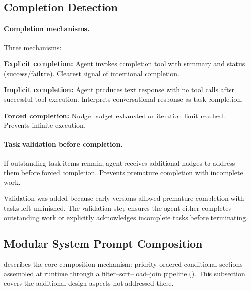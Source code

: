 \subsection{Completion Detection}
\label{sec:completion}

\paragraph{Completion mechanisms.} Three mechanisms:

\begin{packedenumerate}
\item \textbf{Explicit completion:} Agent invokes completion tool with summary and status (success/failure). Clearest signal of intentional completion.
\item \textbf{Implicit completion:} Agent produces text response with no tool calls after successful tool execution. Interprets conversational response as task completion.
\item \textbf{Forced completion:} Nudge budget exhausted or iteration limit reached. Prevents infinite execution.
\end{packedenumerate}

\paragraph{Task validation before completion.} If outstanding task items remain, agent receives additional nudges to address them before forced completion. Prevents premature completion with incomplete work.

Validation was added because early versions allowed premature completion with tasks left unfinished. The validation step ensures the agent either completes outstanding work or explicitly acknowledges incomplete tasks before terminating.

\subsection{Modular System Prompt Composition}
\label{sec:prompt_composition}

 describes the core composition mechanism: priority-ordered conditional sections assembled at runtime through a filter--sort--load--join pipeline (). This subsection covers the additional design aspects not addressed there.

